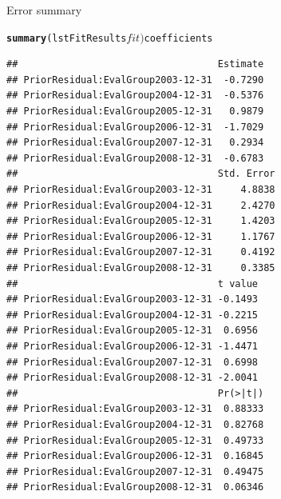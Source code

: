 \documentclass[xcolor=dvipsnames]{beamer}\usepackage{graphicx, color}
\makeatletter
\newcommand{\hlfunctioncall}[1]{\textcolor[rgb]{0.501960784313725,0,0.329411764705882}{\textbf{#1}}}%
\newenvironment{kframe}{%
 \def\at@end@of@kframe{}%
 \ifinner\ifhmode%
  \def\at@end@of@kframe{\end{minipage}}%
  \begin{minipage}{\columnwidth}%
 \fi\fi%
 \def\FrameCommand##1{\hskip\@totalleftmargin \hskip-\fboxsep
 \colorbox{shadecolor}{##1}\hskip-\fboxsep
     \hskip-\linewidth \hskip-\@totalleftmargin \hskip\columnwidth}%
 \MakeFramed {\advance\hsize-\width
   \@totalleftmargin\z@ \linewidth\hsize
   \@setminipage}}%
 {\par\unskip\endMakeFramed%
 \at@end@of@kframe}
\newenvironment{knitrout}{}{} %
\makeatother
\begin{document}
\begin{frame}[fragile]{Error summary}
\begin{knitrout}\tiny
{}\color{fgcolor}\begin{kframe}
\begin{alltt}
\hlfunctioncall{summary}(lstFitResults$fit)$coefficients
\end{alltt}
\begin{verbatim}
##                                   Estimate
## PriorResidual:EvalGroup2003-12-31  -0.7290
## PriorResidual:EvalGroup2004-12-31  -0.5376
## PriorResidual:EvalGroup2005-12-31   0.9879
## PriorResidual:EvalGroup2006-12-31  -1.7029
## PriorResidual:EvalGroup2007-12-31   0.2934
## PriorResidual:EvalGroup2008-12-31  -0.6783
##                                   Std. Error
## PriorResidual:EvalGroup2003-12-31     4.8838
## PriorResidual:EvalGroup2004-12-31     2.4270
## PriorResidual:EvalGroup2005-12-31     1.4203
## PriorResidual:EvalGroup2006-12-31     1.1767
## PriorResidual:EvalGroup2007-12-31     0.4192
## PriorResidual:EvalGroup2008-12-31     0.3385
##                                   t value
## PriorResidual:EvalGroup2003-12-31 -0.1493
## PriorResidual:EvalGroup2004-12-31 -0.2215
## PriorResidual:EvalGroup2005-12-31  0.6956
## PriorResidual:EvalGroup2006-12-31 -1.4471
## PriorResidual:EvalGroup2007-12-31  0.6998
## PriorResidual:EvalGroup2008-12-31 -2.0041
##                                   Pr(>|t|)
## PriorResidual:EvalGroup2003-12-31  0.88333
## PriorResidual:EvalGroup2004-12-31  0.82768
## PriorResidual:EvalGroup2005-12-31  0.49733
## PriorResidual:EvalGroup2006-12-31  0.16845
## PriorResidual:EvalGroup2007-12-31  0.49475
## PriorResidual:EvalGroup2008-12-31  0.06346
\end{verbatim}
\end{kframe}
\end{knitrout}

\end{frame}
\end{document}
